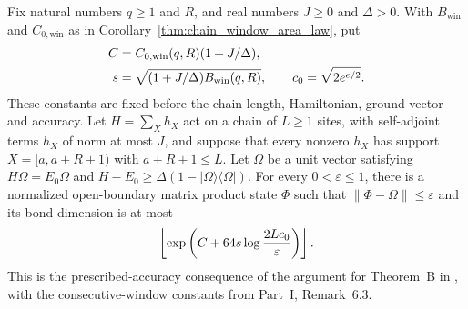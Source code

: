 \begin{corollary}
    \label{thm:chain_window_mps_error}
    \leanok
    Fix natural numbers $q\ge1$ and $R$, and real numbers $J\ge0$ and
    $\Delta>0$. With $B_{\mathrm{win}}$ and $C_{0,\mathrm{win}}$ as in
    Corollary~\ref{thm:chain_window_area_law}, put
    \begin{align}
        C & =C_{0,\mathrm{win}}(q,R)(1+J/\Delta),\notag      \\
        s & =\sqrt{(1+J/\Delta)B_{\mathrm{win}}(q,R)},\qquad
        c_0=\sqrt{2e^{e/2}}.\notag
    \end{align}
    These constants are fixed before the chain length, Hamiltonian,
    ground vector and accuracy. Let $H=\sum_Xh_X$ act on a chain of
    $L\ge1$ sites, with self-adjoint terms $h_X$ of norm at most $J$,
    and suppose that every
    nonzero $h_X$ has support $X=[a,a+R+1)$ with $a+R+1\le L$.
    Let $\Omega$ be a unit vector satisfying $H\Omega=E_0\Omega$ and
    $H-E_0\ge\Delta(1-|\Omega\rangle\langle\Omega|)$.
    For every $0<\varepsilon\le1$, there is a normalized open-boundary
    matrix product state $\Phi$ such that $\|\Phi-\Omega\|\le\varepsilon$
    and its bond dimension is at most
    \begin{align}
        \left\lfloor\exp\left(C+64s\log\frac{2Lc_0}{\varepsilon}\right)
        \right\rfloor.\notag
    \end{align}
    This is the prescribed-accuracy consequence of the argument for
    Theorem~B in \cite[Part~IIa]{TNLean2026OneDimensional}, with the
    consecutive-window constants from Part~I, Remark~6.3.
\end{corollary}
